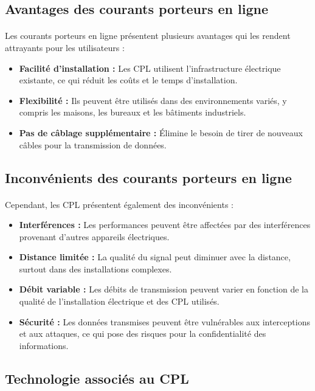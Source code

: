 \documentclass[a4paper,twocolumn]{report}
\begin{document}
\subsection{Avantages des courants porteurs en ligne}
\paragraph{} Les courants porteurs en ligne présentent plusieurs avantages qui les rendent attrayants pour les utilisateurs :
\begin{itemize}
	\item \textbf{Facilité d'installation :} Les CPL utilisent l'infrastructure
    électrique existante, ce qui réduit les coûts et le temps d'installation.
	\item \textbf{Flexibilité :} Ils peuvent être utilisés dans des environnements variés,
    y compris les maisons, les bureaux et les bâtiments industriels.
	\item \textbf{Pas de câblage supplémentaire :} Élimine le besoin de tirer de
    nouveaux câbles pour la transmission de données.
\end{itemize}

\subsection{Inconvénients des courants porteurs en ligne}
\paragraph{} Cependant, les CPL présentent également des inconvénients :
\begin{itemize}
	\item \textbf{Interférences :} Les performances peuvent être affectées par des
    interférences provenant d'autres appareils électriques.
	\item \textbf{Distance limitée :} La qualité du signal peut diminuer avec la distance,
    surtout dans des installations complexes.
	\item \textbf{Débit variable :} Les débits de transmission peuvent varier en fonction
    de la qualité de l'installation électrique et des CPL utilisés.
	\item \textbf{Sécurité :} Les données transmises peuvent être vulnérables aux interceptions et aux attaques, ce qui pose des risques pour la confidentialité des informations.
\end{itemize}

\subsection{Technologie associés au CPL}
\end{document}
